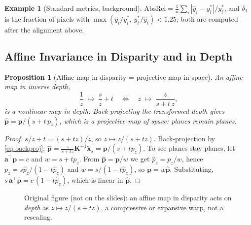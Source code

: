 \documentclass[11pt,a4paper]{article}
\newcommand{\xt}{\tilde{\mathbf{x}}}
\newcommand{\Kinv}{\bm K^{-1}}
\theoremstyle{definition}
\newtheorem{example}[definition]{Example}
\theoremstyle{plain}
\newtheorem{proposition}[definition]{Proposition}
\theoremstyle{remark}
\begin{document}
\begin{example}[Standard metrics, background]
$\mathrm{AbsRel}=\frac1n\sum_i|\hat y_i-y^\ast_i|/y^\ast_i$, and $\delta_1$ is the fraction of pixels with $\max(\hat y_i/y^\ast_i,\,y^\ast_i/\hat y_i)<1.25$; both are computed after the alignment above.
\end{example}
 
\subsection{Affine Invariance in Disparity and in Depth }
 
\begin{proposition}[Affine map in disparity = projective map in space]\label{prop:affdisp}
An affine map in inverse depth,
\[
\frac1z\;\longmapsto\;\frac{s}{z}+t\quad\Longleftrightarrow\quad z\;\longmapsto\;\frac{z}{s+t\,z},
\]
is a nonlinear map in depth. Back-projecting the transformed depth gives $\hat{\bm p}=\bm p/(s+t\,p_z)$, which is a \emph{projective} map of space: planes remain planes.
\end{proposition}
\begin{proof}
$s/z+t=(s+tz)/z$, so $z\mapsto z/(s+tz)$. Back-projection by \eqref{eq:backproj}: $\hat{\bm p}=\frac{z}{s+tz}\Kinv\xt_s=\bm p/(s+tp_z)$. To see planes stay planes, let $\bm a^\top\bm p=c$ and $w=s+tp_z$. From $\hat{\bm p}=\bm p/w$ we get $\hat p_z=p_z/w$, hence $p_z=s\hat p_z/(1-t\hat p_z)$ and $w=s/(1-t\hat p_z)$, so $\bm p=w\hat{\bm p}$. Substituting, $s\,\bm a^\top\hat{\bm p}=c\,(1-t\hat p_z)$, which is linear in $\hat{\bm p}$. \qedhere
\end{proof}
 
\begin{figure}[htbp]
\centering
{}
\caption{Original figure (not on the slides): an affine map in disparity acts on \emph{depth} as $z\mapsto z/(s+tz)$, a compressive or expansive warp, not a rescaling.}
\end{figure}
 
\end{document}
